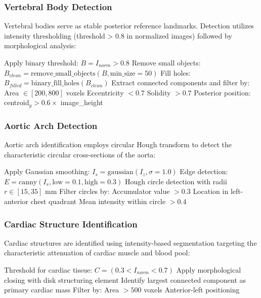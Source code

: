 \documentclass[11pt,a4paper]{article}
\begin{document}
\subsubsection{Vertebral Body Detection}
Vertebral bodies serve as stable posterior reference landmarks. Detection utilizes intensity thresholding (threshold > 0.8 in normalized images) followed by morphological analysis:

\begin{algorithmic}[1]
\STATE Apply binary threshold: $B = I_{norm} > 0.8$
\STATE Remove small objects: $B_{clean} = \text{remove\_small\_objects}(B, \text{min\_size}=50)$
\STATE Fill holes: $B_{filled} = \text{binary\_fill\_holes}(B_{clean})$
\STATE Extract connected components and filter by:
\STATE \quad Area $\in [200, 800]$ voxels
\STATE \quad Eccentricity $< 0.7$
\STATE \quad Solidity $> 0.7$
\STATE \quad Posterior position: centroid$_y > 0.6 \times$ image\_height
\end{algorithmic}

\subsubsection{Aortic Arch Detection}
Aortic arch identification employs circular Hough transform to detect the characteristic circular cross-sections of the aorta:

\begin{algorithmic}[1]
\STATE Apply Gaussian smoothing: $I_s = \text{gaussian}(I_z, \sigma=1.0)$
\STATE Edge detection: $E = \text{canny}(I_s, \text{low}=0.1, \text{high}=0.3)$
\STATE Hough circle detection with radii $r \in [15, 35]$ mm
\STATE Filter circles by:
\STATE \quad Accumulator value $> 0.3$
\STATE \quad Location in left-anterior chest quadrant
\STATE \quad Mean intensity within circle $> 0.4$
\ENDFOR
\end{algorithmic}

\subsubsection{Cardiac Structure Identification}
Cardiac structures are identified using intensity-based segmentation targeting the characteristic attenuation of cardiac muscle and blood pool:

\begin{algorithmic}[1]
\STATE Threshold for cardiac tissue: $C = (0.3 < I_{norm} < 0.7)$
\STATE Apply morphological closing with disk structuring element
\STATE Identify largest connected component as primary cardiac mass
\STATE Filter by:
\STATE \quad Area $> 500$ voxels
\STATE \quad Anterior-left positioning
\end{algorithmic}
\end{document}
